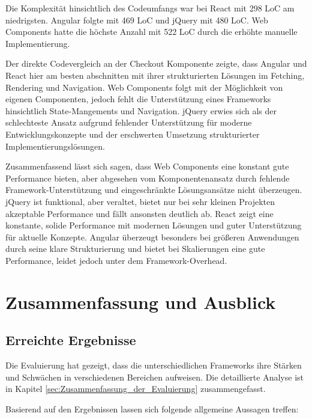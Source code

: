 \documentclass[oneside]{ausarbeitung}
\begin{document}
Die Komplexität hinsichtlich des Codeumfangs war bei React mit 298 LoC am niedrigsten. Angular folgte mit 469 LoC und jQuery mit 480 LoC. Web Components hatte die höchste Anzahl mit 522 LoC durch die erhöhte manuelle Implementierung. 

Der direkte Codevergleich an der Checkout Komponente zeigte, dass Angular und React hier am besten abschnitten mit ihrer strukturierten Lösungen im Fetching, Rendering und Navigation. Web Components folgt mit der Möglichkeit von eigenen Componenten, jedoch fehlt die Unterstützung eines Frameworks hinsichtlich State-Mangements und Navigation. jQuery erwies sich als der schlechteste Ansatz aufgrund fehlender Unterstützung für moderne Entwicklungskonzepte und der erschwerten Umsetzung strukturierter Implementierungslösungen.

Zusammenfassend lässt sich sagen, dass Web Components eine konstant gute Performance bieten, aber abgesehen vom Komponentenansatz durch fehlende Framework-Unterstützung und eingeschränkte Lösungsansätze nicht überzeugen. jQuery ist funktional, aber veraltet, bietet nur bei sehr kleinen Projekten akzeptable Performance und fällt ansonsten deutlich ab. React zeigt eine konstante, solide Performance mit modernen Lösungen und guter Unterstützung für aktuelle Konzepte. Angular überzeugt besonders bei größeren Anwendungen durch seine klare Strukturierung und bietet bei Skalierungen eine gute Performance, leidet jedoch unter dem Framework-Overhead.

\chapter{Zusammenfassung und Ausblick}
\label{cha:zusammenfassung}
\section{Erreichte Ergebnisse}
\label{sec:ergebnisse}

Die Evaluierung hat gezeigt, dass die unterschiedlichen Frameworks ihre Stärken und Schwächen in verschiedenen Bereichen aufweisen. Die detaillierte Analyse ist in Kapitel \ref{sec:Zusammenfassung_der_Evaluierung} zusammengefasst. 

Basierend auf den Ergebnissen lassen sich folgende allgemeine Aussagen treffen:
\end{document}
